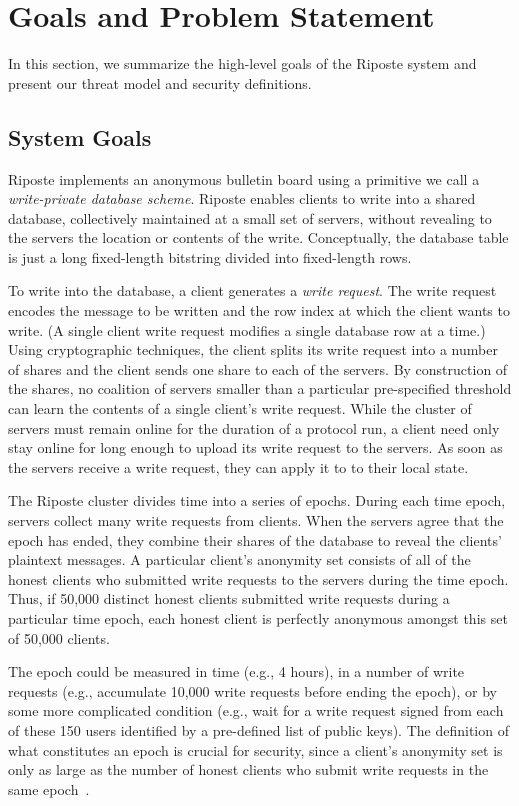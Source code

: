 \documentclass[10pt,twocolumn]{article}
\newcommand{\name}{Riposte\xspace}
\newcommand{\Name}{Riposte\xspace}
\begin{document}
 \section{Goals and Problem Statement}
\label{sec:goal}

In this section, we summarize the high-level goals of the \name system and
present our threat model and security definitions.

\subsection{System Goals}

\Name implements an anonymous bulletin board using a
primitive we call a \textit{write-private database scheme}.
\Name enables clients to write into a shared
database, collectively maintained at a small set of servers,
without revealing to the servers the location or contents of the write.
Conceptually, the database table 
is just a long fixed-length bitstring divided into fixed-length rows. 

To write into the database, a client generates a {\em write request}. 
The write request encodes the message to be written
and the row index at which the client wants to write.
(A single client write request modifies a single 
database row at a time.)
Using cryptographic techniques, the client splits its write request
into a number of shares and the client sends 
one share to each of the servers.
By construction of the shares, no coalition of servers
smaller than a particular pre-specified threshold 
can learn the contents of a single client's write request.
While the cluster of servers must remain online for the duration 
of a protocol run, a client need only stay online for long enough to 
upload its write request to the servers.
As soon as the servers receive a write request, they
can apply it to to their local state. 

The \name cluster divides time into a series of epochs.
During each time epoch, servers collect many write requests from clients.
When the servers agree that the epoch has ended, they
combine their shares of the database to reveal the clients' plaintext messages.
A particular client's anonymity set consists of all of the honest clients
who submitted write requests to the servers during the time epoch.  
Thus, if 50,000 distinct honest clients submitted write requests
during a particular time epoch, each honest client is perfectly anonymous
amongst this set of 50,000 clients.

The epoch could be measured in time (e.g., 4 hours), in
a number of write requests (e.g., accumulate 10,000 write
requests before ending the epoch), or by
some more complicated condition
(e.g., wait for a write request signed from each of these
150 users identified by a pre-defined list of public keys).
The definition of what constitutes an epoch is crucial for security,
since a client's anonymity set is only as large as the number of
honest clients who submit write requests in the 
same epoch~\cite{serjantov2003trickle}.
\end{document}
